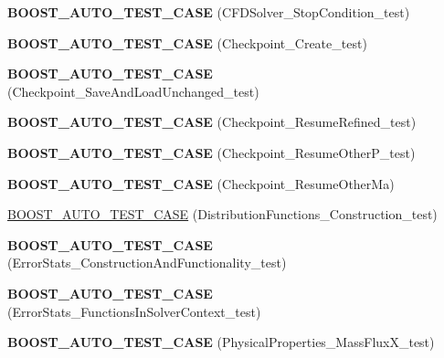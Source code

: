 \begin{DoxyCompactItemize}
\item 
\hypertarget{namespacenatrium_a48b188e2db3a9d04be4801adbd6badcb}{
{\bfseries BOOST\_\-AUTO\_\-TEST\_\-CASE} (CFDSolver\_\-StopCondition\_\-test)}
\label{namespacenatrium_a48b188e2db3a9d04be4801adbd6badcb}

\item 
\hypertarget{namespacenatrium_a0906093004ceddfcc527abaa0a6f7931}{
{\bfseries BOOST\_\-AUTO\_\-TEST\_\-CASE} (Checkpoint\_\-Create\_\-test)}
\label{namespacenatrium_a0906093004ceddfcc527abaa0a6f7931}

\item 
\hypertarget{namespacenatrium_ab20dbe3d70cebe3c4d076fdb8963150a}{
{\bfseries BOOST\_\-AUTO\_\-TEST\_\-CASE} (Checkpoint\_\-SaveAndLoadUnchanged\_\-test)}
\label{namespacenatrium_ab20dbe3d70cebe3c4d076fdb8963150a}

\item 
\hypertarget{namespacenatrium_a9bb1426901f85aa278e9aaa0bc3c292e}{
{\bfseries BOOST\_\-AUTO\_\-TEST\_\-CASE} (Checkpoint\_\-ResumeRefined\_\-test)}
\label{namespacenatrium_a9bb1426901f85aa278e9aaa0bc3c292e}

\item 
\hypertarget{namespacenatrium_aef2253e44a4a45889806bbb338a603e5}{
{\bfseries BOOST\_\-AUTO\_\-TEST\_\-CASE} (Checkpoint\_\-ResumeOtherP\_\-test)}
\label{namespacenatrium_aef2253e44a4a45889806bbb338a603e5}

\item 
\hypertarget{namespacenatrium_a039c9382ee32f6158c43183385ca6b6b}{
{\bfseries BOOST\_\-AUTO\_\-TEST\_\-CASE} (Checkpoint\_\-ResumeOtherMa)}
\label{namespacenatrium_a039c9382ee32f6158c43183385ca6b6b}

\item 
\hyperlink{namespacenatrium_a3fc48dbb8fbf2d4a981c1d02ef5e555e}{BOOST\_\-AUTO\_\-TEST\_\-CASE} (DistributionFunctions\_\-Construction\_\-test)
\item 
\hypertarget{namespacenatrium_a5b8ba00780d9b64478d38f0e0942f9fe}{
{\bfseries BOOST\_\-AUTO\_\-TEST\_\-CASE} (ErrorStats\_\-ConstructionAndFunctionality\_\-test)}
\label{namespacenatrium_a5b8ba00780d9b64478d38f0e0942f9fe}

\item 
\hypertarget{namespacenatrium_a2ce53d6763ffb6dcdceef6ca14b2c8a1}{
{\bfseries BOOST\_\-AUTO\_\-TEST\_\-CASE} (ErrorStats\_\-FunctionsInSolverContext\_\-test)}
\label{namespacenatrium_a2ce53d6763ffb6dcdceef6ca14b2c8a1}

\item 
\hypertarget{namespacenatrium_a0609cd32e1900e7276c5ef3b8787cb51}{
{\bfseries BOOST\_\-AUTO\_\-TEST\_\-CASE} (PhysicalProperties\_\-MassFluxX\_\-test)}
\label{namespacenatrium_a0609cd32e1900e7276c5ef3b8787cb51}


\end{DoxyCompactItemize}
